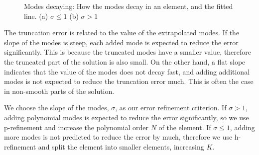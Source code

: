 \begin{figure}[H]
	\centering
	\hfill
	\caption{Modes decaying: How the modes decay in an element, and the fitted line. (a) \(\sigma \leqslant 1\) (b) \(\sigma > 1\)}\label{fig:decaying_modes}
\end{figure}

The truncation error is related to the value of the extrapolated modes. If the slope of the modes is
steep, each added mode is expected to reduce the error significantly. This is because the truncated modes
have a smaller value, therefore the truncated part of the solution is also small. On the other hand,
a flat slope indicates that the value of the modes does not decay fast, and adding additional modes
is not expected to reduce the truncation error much. This is often the case in non-smooth parts of
the solution.

We choose the slope of the modes, \(\sigma \), as our error refinement criterion. If \(\sigma > 1\),
adding polynomial modes is expected to reduce the error significantly, so we use p-refinement and
increase the polynomial order \(N\) of the element. If \(\sigma \leqslant 1\), adding more modes is
not predicted to reduce the error by much, therefore we use h-refinement and split the element into
smaller elements, increasing \(K\).

